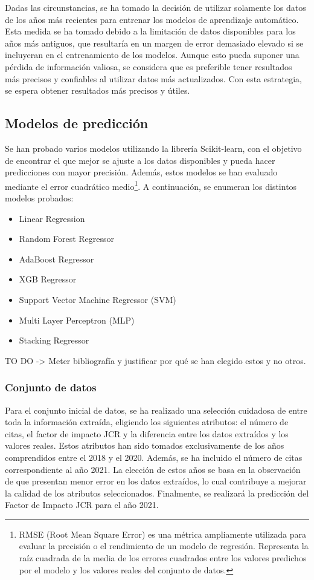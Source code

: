 Dadas las circunstancias, se ha tomado la decisión de utilizar solamente los datos de los años más recientes para entrenar los modelos de aprendizaje automático. Esta medida se ha tomado debido a la limitación de datos disponibles para los años más antiguos, que resultaría en un margen de error demasiado elevado si se incluyeran en el entrenamiento de los modelos. Aunque esto pueda suponer una pérdida de información valiosa, se considera que es preferible tener resultados más precisos y confiables al utilizar datos más actualizados. Con esta estrategia, se espera obtener resultados más precisos y útiles.

\subsection{Modelos de predicción}

Se han probado varios modelos utilizando la librería Scikit-learn, con el objetivo de encontrar el que mejor se ajuste a los datos disponibles y pueda hacer predicciones con mayor precisión. Además, estos modelos se han evaluado mediante el error cuadrático medio\footnote{RMSE (Root Mean Square Error) es una métrica ampliamente utilizada para evaluar la precisión o el rendimiento de un modelo de regresión. Representa la raíz cuadrada de la media de los errores cuadrados entre los valores predichos por el modelo y los valores reales del conjunto de datos.}. A continuación, se enumeran los distintos modelos probados:
\begin{itemize}
    \item Linear Regression 
    \item Random Forest Regressor
    \item AdaBoost Regressor
    \item XGB Regressor
    \item Support Vector Machine Regressor (SVM)
    \item Multi Layer Perceptron (MLP)
    \item Stacking Regressor
\end{itemize}

TO DO -> Meter bibliografía y justificar por qué se han elegido estos y no otros.

\subsubsection{Conjunto de datos}
Para el conjunto inicial de datos, se ha realizado una selección cuidadosa de entre toda la información extraída, eligiendo los siguientes atributos: el número de citas, el factor de impacto JCR y la diferencia entre los datos extraídos y los valores reales. Estos atributos han sido tomados exclusivamente de los años comprendidos entre el 2018 y el 2020. Además, se ha incluido el número de citas correspondiente al año 2021. La elección de estos años se basa en la observación de que presentan menor error en los datos extraídos, lo cual contribuye a mejorar la calidad de los atributos seleccionados. Finalmente, se realizará la predicción del Factor de Impacto JCR para el año 2021.

